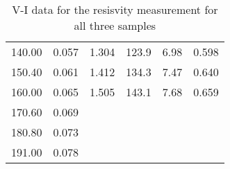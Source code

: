 \begin{table}[H]
\begin{tabular}{|cc|cc|cc|}
    \multicolumn{1}{|c|}{140.00} & 0.057 & \multicolumn{1}{c|}{1.304} & 123.9 & \multicolumn{1}{c|}{6.98} & 0.598 \\
    \multicolumn{1}{|c|}{150.40} & 0.061 & \multicolumn{1}{c|}{1.412} & 134.3 & \multicolumn{1}{c|}{7.47} & 0.640 \\
    \multicolumn{1}{|c|}{160.00} & 0.065 & \multicolumn{1}{c|}{1.505} & 143.1 & \multicolumn{1}{c|}{7.68} & 0.659 \\
    \multicolumn{1}{|c|}{170.60} & 0.069 & \multicolumn{1}{c|}{} &  & \multicolumn{1}{c|}{} &  \\
    \multicolumn{1}{|c|}{180.80} & 0.073 & \multicolumn{1}{c|}{} &  & \multicolumn{1}{c|}{} &  \\
    \multicolumn{1}{|c|}{191.00} & 0.078 & \multicolumn{1}{c|}{} &  & \multicolumn{1}{c|}{} &  \\ \hline
    \end{tabular}
    \caption{V-I data for the resisvity measurement for all three samples}
    \label{tab:1}
\end{table}
